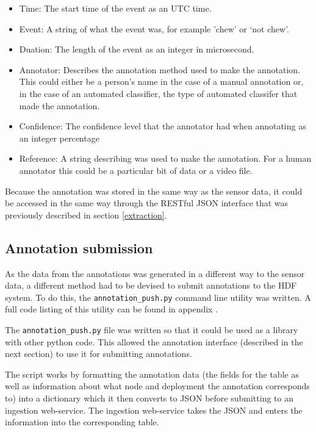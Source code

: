 \begin{itemize}
\item Time: The start time of the event as an UTC time.

\item Event: A string of what the event was, for example 'chew' or `not chew'.

\item Duation: The length of the event as an integer in microsecond.

\item Annotator: Describes the annotation method used to make the annotation. This could either be a person's name in the case of a manual annotation or, in the case of an automated classifier, the type of automated classifer that made the annotation.

\item Confidence: The confidence level that the annotator had when annotating as an integer percentage

\item Reference: A string describing was used to make the annotation. For a human annotator this could be a particular bit of data or a video file. 
\end{itemize}

Because the annotation was stored in the same way as the sensor data, it could be accessed in the same way through the RESTful JSON interface that was previously described in section \ref{extraction}. 

\subsection{Annotation submission}
As the data from the annotations was generated in a different way to the sensor data, a different method had to be devised to submit annotations to the HDF system. To do this, the \texttt{annotation\_push.py} command line utility was written. A full code listing of this utility can be found in appendix \label{appendixannotationpush}.

The \texttt{annotation\_push.py} file was written so that it could be used as a library with other python code. This allowed the annotation interface (described in the next section) to use it for submitting annotations. 

The script works by formatting the annotation data (the fields for the table as well as information about what node and deployment the annotation corresponds to) into a dictionary which it then converts to JSON before submitting to an ingestion web-service. The ingestion web-service takes the JSON and enters the information into the corresponding table. 

